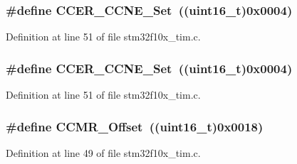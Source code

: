 \subsubsection[{\texorpdfstring{C\+C\+E\+R\+\_\+\+C\+C\+N\+E\+\_\+\+Set}{CCER_CCNE_Set}}]{\setlength{\rightskip}{0pt plus 5cm}\#define C\+C\+E\+R\+\_\+\+C\+C\+N\+E\+\_\+\+Set~(({\bf uint16\+\_\+t})0x0004)}\hypertarget{group___t_i_m___private___defines_ga167dfdf613827d1fdf2e4152497b4bd5}{}\label{group___t_i_m___private___defines_ga167dfdf613827d1fdf2e4152497b4bd5}


Definition at line 51 of file stm32f10x\+\_\+tim.\+c.

\subsubsection[{\texorpdfstring{C\+C\+E\+R\+\_\+\+C\+C\+N\+E\+\_\+\+Set}{CCER_CCNE_Set}}]{\setlength{\rightskip}{0pt plus 5cm}\#define C\+C\+E\+R\+\_\+\+C\+C\+N\+E\+\_\+\+Set~(({\bf uint16\+\_\+t})0x0004)}\hypertarget{group___t_i_m___private___defines_ga167dfdf613827d1fdf2e4152497b4bd5}{}\label{group___t_i_m___private___defines_ga167dfdf613827d1fdf2e4152497b4bd5}


Definition at line 51 of file stm32f10x\+\_\+tim.\+c.

\subsubsection[{\texorpdfstring{C\+C\+M\+R\+\_\+\+Offset}{CCMR_Offset}}]{\setlength{\rightskip}{0pt plus 5cm}\#define C\+C\+M\+R\+\_\+\+Offset~(({\bf uint16\+\_\+t})0x0018)}\hypertarget{group___t_i_m___private___defines_ga76469c9f56da4e7705336a6ac0248196}{}\label{group___t_i_m___private___defines_ga76469c9f56da4e7705336a6ac0248196}


Definition at line 49 of file stm32f10x\+\_\+tim.\+c.

